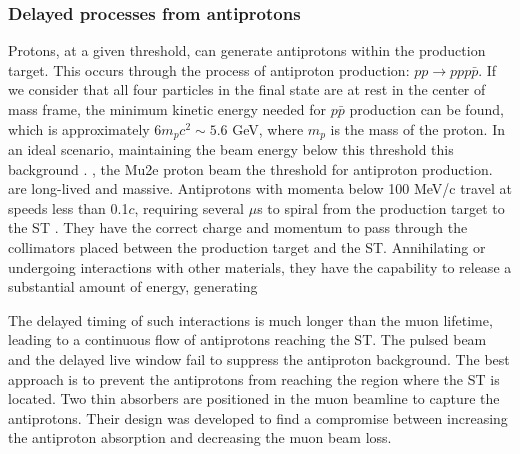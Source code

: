 \subsubsection{Delayed processes from antiprotons}
Protons, at a given threshold, can generate antiprotons 
within the production target. This occurs through the 
process of antiproton production: $pp \rightarrow ppp\bar{p}$. 
If we consider that all four particles in the final state are 
at rest in the center of mass frame, the minimum kinetic energy 
needed for $p\bar{p}$ production can be found, which is 
approximately $6 m_pc^2 \sim 5.6$ GeV, where $m_p$ is the 
mass of the proton. In an ideal scenario, maintaining the 
beam energy below this threshold 
this background .
, the Mu2e 
proton beam  the threshold for antiproton production. 
 are long-lived and massive. Antiprotons with 
momenta below 100 MeV/c travel at speeds less than 0.1$c$, 
requiring several $\mu$s to spiral from the production target 
to the ST \cite{bartoszek2015mu2e}. They have the correct 
charge and momentum to pass through the collimators placed 
between the production target and the ST. Annihilating or 
undergoing interactions with other materials, they have the 
capability to release a substantial amount of energy, generating 


The delayed timing of 
such interactions is much longer than the muon lifetime, leading to a 
continuous flow of antiprotons reaching the ST. The pulsed beam and 
the delayed live window fail to suppress the antiproton background. 
The best approach is to prevent the antiprotons from reaching the 
region where the ST is located.
Two thin absorbers are positioned in 
the muon beamline to capture the antiprotons. Their design was 
developed to find a compromise between increasing the antiproton 
absorption and decreasing the muon beam loss. 

